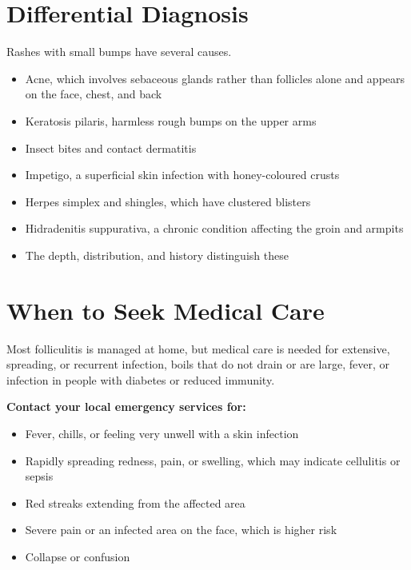 \section*{Differential Diagnosis}
Rashes with small bumps have several causes.
\begin{itemize}
    \item Acne, which involves sebaceous glands rather than follicles alone and appears on the face, chest, and back
    \item Keratosis pilaris, harmless rough bumps on the upper arms
    \item Insect bites and contact dermatitis
    \item Impetigo, a superficial skin infection with honey-coloured crusts
    \item Herpes simplex and shingles, which have clustered blisters
    \item Hidradenitis suppurativa, a chronic condition affecting the groin and armpits
    \item The depth, distribution, and history distinguish these
\end{itemize}

\section*{When to Seek Medical Care}
Most folliculitis is managed at home, but medical care is needed for extensive, spreading, or recurrent infection, boils that do not drain or are large, fever, or infection in people with diabetes or reduced immunity.

\textbf{Contact your local emergency services for:}
\begin{itemize}
    \item Fever, chills, or feeling very unwell with a skin infection
    \item Rapidly spreading redness, pain, or swelling, which may indicate cellulitis or sepsis
    \item Red streaks extending from the affected area
    \item Severe pain or an infected area on the face, which is higher risk
    \item Collapse or confusion
\end{itemize}

